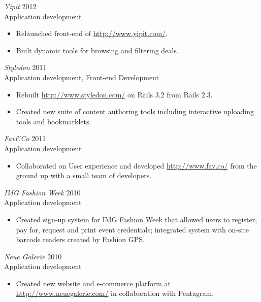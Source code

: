 \documentclass[line,margin]{res}
\begin{document}
\begin{resume}
    \begin{samepage}
    {\sl Yipit}
    \hfill 2012 \\
    Application development
    \begin{itemize} \itemsep -2pt
        \item
            Relaunched front-end of \url{http://www.yipit.com/}.

        \item
            Built dynamic tools for browsing and filtering deals.
    \end{itemize}
    \end{samepage}

    {\sl Styledon}
    \hfill 2011 \\
    Application development, Front-end Development
    \begin{itemize} \itemsep -2pt
        \item
            Rebuilt \url{http://www.styledon.com/} on Rails 3.2 from Rails
            2.3.

        \item
            Created new suite of content authoring tools including interactive
            uploading tools and bookmarklets.
    \end{itemize}

    {\sl Fav\&Co}
    \hfill 2011 \\
    Application development
    \begin{itemize} \itemsep -2pt
        \item
            Collaborated on User experience and developed
            \url{http://www.fav.co/} from the ground up with a small team of
            developers.

    \end{itemize}

    {\sl IMG Fashion Week}
    \hfill 2010 \\
    Application development
    \begin{itemize} \itemsep -2pt
        \item
            Created sign-up system for IMG Fashion Week that allowed users to
            register, pay for, request and print event credentials; integrated
            system with on-site barcode readers created by Fashion GPS.
    \end{itemize}

    {\sl Neue Galerie}
    \hfill 2010 \\
    Application development
    \begin{itemize} \itemsep -2pt
        \item
            Created new website and e-commerce platform at
            \mbox{\url{http://www.neuegalerie.com/}} in collaboration with
            Pentagram.


\end{itemize}
\end{resume}
\end{document}
